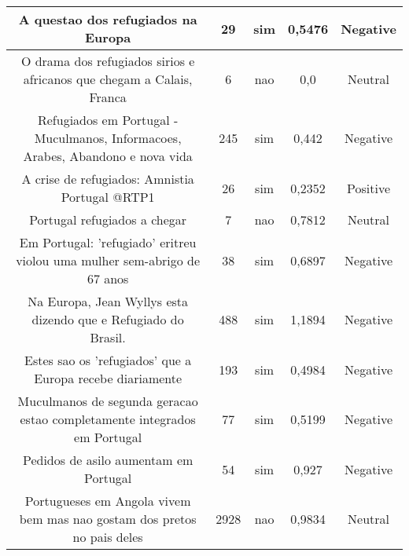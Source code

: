 \documentclass[11pt]{article}
\newlength\mylength
\begin{document}
\begin{center}
\begin{longtable}{||C{.40\mylength}||C{.20\mylength}||C{.20\mylength}||C{.30\mylength}||C{.20\mylength}||}
   A questao dos refugiados na Europa  & 29 & sim & 0,5476 & Negative \\  \hline
   O drama dos refugiados sirios e africanos que chegam a Calais, Franca  & 6 & nao & 0,0 & Neutral \\  \hline
   Refugiados em Portugal - Muculmanos, Informacoes, Arabes, Abandono e nova vida  & 245 & sim & 0,442 & Negative \\  \hline
   A crise de refugiados: Amnistia Portugal @RTP1  & 26 & sim & 0,2352 & Positive \\  \hline
   Portugal refugiados a chegar  & 7 & nao & 0,7812 & Neutral \\  \hline
   Em Portugal: 'refugiado' eritreu violou uma mulher sem-abrigo de 67 anos  & 38 & sim & 0,6897 & Negative \\  \hline
   Na Europa, Jean Wyllys esta dizendo que e Refugiado do Brasil.  & 488 & sim & 1,1894 & Negative \\  \hline
   Estes sao os 'refugiados' que a Europa recebe diariamente  & 193 & sim & 0,4984 & Negative \\  \hline
   Muculmanos de segunda geracao estao completamente integrados em Portugal  & 77 & sim & 0,5199 & Negative \\  \hline
   Pedidos de asilo aumentam em Portugal  & 54 & sim & 0,927 & Negative \\  \hline
   Portugueses em Angola vivem bem mas nao gostam dos pretos no pais deles  & 2928 & nao & 0,9834 & Neutral \\  \hline

\end{longtable}
\end{center}
\end{document}
